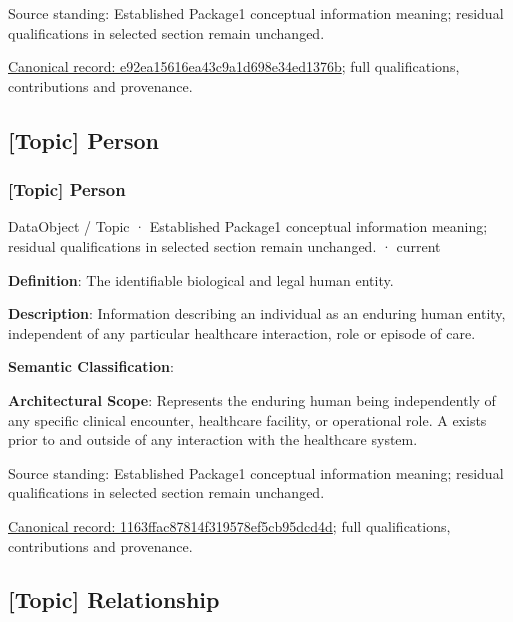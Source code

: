 Source standing: Established Package1 conceptual information meaning; residual qualifications in selected section remain unchanged.


{\footnotesize \href{../../../../continuum/application/data-object/topic/e92ea15616ea43c9a1d698e34ed1376b.md}{Canonical record: e92ea15616ea43c9a1d698e34ed1376b}; full qualifications, contributions and provenance.}\par
\subsection{[Topic] Person}

\subsubsection{[Topic] Person}

\label{element:1163ffac87814f319578ef5cb95dcd4d}
{\small DataObject / Topic · Established Package1 conceptual information meaning; residual qualifications in selected section remain unchanged. · current}\par

\textbf{Definition}: The identifiable biological and legal human entity.



\textbf{Description}: Information describing an individual as an enduring human entity, independent of any particular healthcare interaction, role or episode of care.



\textbf{Semantic Classification}: \texttt{}



\textbf{Architectural Scope}: Represents the enduring human being independently of any specific clinical encounter, healthcare facility, or operational role. A \texttt{} exists prior to and outside of any interaction with the healthcare system.



Source standing: Established Package1 conceptual information meaning; residual qualifications in selected section remain unchanged.


{\footnotesize \href{../../../../continuum/application/data-object/topic/1163ffac87814f319578ef5cb95dcd4d.md}{Canonical record: 1163ffac87814f319578ef5cb95dcd4d}; full qualifications, contributions and provenance.}\par
\subsection{[Topic] Relationship}

